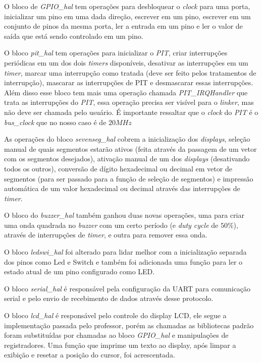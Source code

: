 \documentclass{article}
\begin{document}
O bloco de \textit{GPIO\_hal} tem operações para desbloquear o \textit{clock} para uma porta, inicializar um pino em uma dada direção, escrever em um pino, escrever em um conjunto de pinos da mesma porta, ler a entrada em um pino e ler o valor de saída que está sendo controlado em um pino.

O bloco \textit{pit\_hal} tem operações para inicializar o \textit{PIT}, criar interrupções periódicas em um dos dois \textit{timers} disponíveis, desativar as interrupções em um \textit{timer}, marcar uma interrupção como tratada (deve ser feito pelos tratamentos de interrupção), mascarar as interrupções de PIT e desmascarar essas interrupções. Além disso esse bloco tem mais uma operação chamada \textit{PIT\_IRQHandler }que trata as interrupções do \textit{PIT}, essa operação precisa ser visível para o \textit{linker}, mas não deve ser chamada pelo usuário. É importante ressaltar que o \textit{clock} do \textit{PIT} é o \textit{bus\_clock} que no nosso caso é de $20MHz$

As operações do bloco \textit{sevenseg\_hal} cobrem a inicialização dos \textit{displays}, seleção manual de quais segmentos estarão ativos (feita através da passagem de um vetor com os segmentos desejados), ativação manual de um dos \textit{displays} (desativando todos os outros), conversão de dígito hexadecimal ou decimal em vetor de segmentos (para ser passado para a função de seleção de segmentos) e impressão automática de um valor hexadecimal ou decimal através das interrupções de \textit{timer}.

O bloco do \textit{buzzer\_hal} também ganhou duas novas operações, uma para criar uma onda quadrada no \textit{buzzer} com um certo período (e \textit{duty cycle} de $50\%$), através de interrupções de \textit{timer}, e outra para remover essa onda.

O bloco \textit{ledswi\_hal} foi alterado para lidar melhor com a inicialização separada dos pinos como Led e Switch e também foi adicionada uma função para ler o estado atual de um pino configurado como LED.

O bloco \textit{serial\_hal} é responsável pela configuração da UART para comunicação serial e pelo envio de recebimento de dados através desse protocolo.

O bloco \textit{lcd\_hal} é responsável pelo controle do display LCD, ele segue a implementação passada pelo professor, porém as chamadas as bibliotecas padrão foram substituídas por chamadas ao bloco \textit{GPIO\_hal} e manipulações de registradores. Uma função que imprime um texto ao display, após limpar a exibição e resetar a posição do cursor, foi acrescentada.
\end{document}
